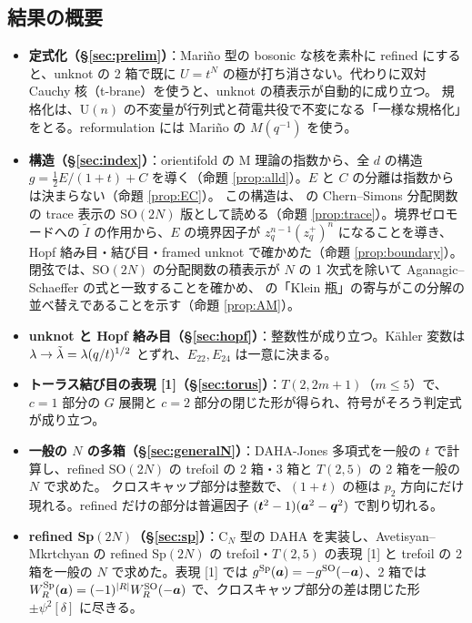 \subsection{結果の概要}
\begin{itemize}
\item \textbf{定式化（§\ref{sec:prelim}）}：Mariño 型の bosonic な核を素朴に refined にすると、unknot の 2 箱で既に $U = t^N$ の極が打ち消さない。代わりに双対 Cauchy 核（t-brane）を使うと、unknot の積表示が自動的に成り立つ。
規格化は、U$(n)$ の不変量が行列式と荷電共役で不変になる「一様な規格化」をとる。reformulation には Mariño の $M(q^{-1})$ を使う。
\item \textbf{構造（§\ref{sec:index}）}：orientifold の M 理論の指数から、全 $d$ の構造 $g = \tfrac12 E/(1+t) + C$ を導く（命題 \ref{prop:alld}）。$E$ と $C$ の分離は指数からは決まらない（命題 \ref{prop:EC}）。
この構造は、\cite{Witten11} の Chern--Simons 分配関数の trace 表示の SO$(2N)$ 版として読める（命題 \ref{prop:trace}）。境界ゼロモードへの $\tilde I$ の作用から、$E$ の境界因子が $z_q^{n-1}(z_q^+)^n$ になることを導き、Hopf 絡み目・結び目・framed unknot で確かめた（命題 \ref{prop:boundary}）。
閉弦では、SO$(2N)$ の分配関数の積表示が $N$ の 1 次式を除いて Aganagic--Schaeffer の式と一致することを確かめ、\cite{AM22} の「Klein 瓶」の寄与がこの分解の並べ替えであることを示す（命題 \ref{prop:AM}）。
\item \textbf{unknot と Hopf 絡み目（§\ref{sec:hopf}）}：整数性が成り立つ。Kähler 変数は $\lambda \to \tilde\lambda = \lambda(q/t)^{1/2}$ とずれ、$E_{22}, E_{24}$ は一意に決まる。
\item \textbf{トーラス結び目の表現 [1]（§\ref{sec:torus}）}：$T(2,2m+1)$（$m \le 5$）で、$c = 1$ 部分の $G$ 展開と $c = 2$ 部分の閉じた形が得られ、符号がそろう判定式が成り立つ。
\item \textbf{一般の $N$ の多箱（§\ref{sec:generalN}）}：DAHA-Jones 多項式を一般の $t$ で計算し、refined SO$(2N)$ の trefoil の 2 箱・3 箱と $T(2,5)$ の 2 箱を一般の $N$ で求めた。
クロスキャップ部分は整数で、$(1+t)$ の極は $p_2$ 方向にだけ現れる。refined だけの部分は普遍因子 $(\bm{t}^2 - 1)(\bm{a}^2 - \bm{q}^2)$ で割り切れる。
\item \textbf{refined Sp$(2N)$（§\ref{sec:sp}）}：C$_N$ 型の DAHA を実装し、Avetisyan--Mkrtchyan の refined Sp$(2N)$ の trefoil・$T(2,5)$ の表現 [1] と trefoil の 2 箱を一般の $N$ で求めた。表現 [1] では $g^{\mathrm{Sp}}(\bm{a}) = -g^{\mathrm{SO}}(-\bm{a})$、2 箱では $W^{\mathrm{Sp}}_R(\bm{a}) = (-1)^{|R|} W^{\mathrm{SO}}_R(-\bm{a})$ で、クロスキャップ部分の差は閉じた形 $\pm\psi^2[\delta]$ に尽きる。

\end{itemize}
